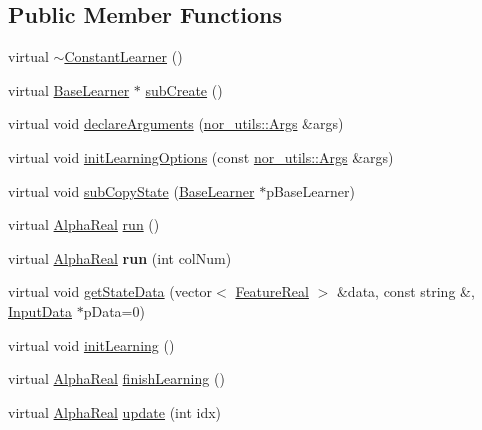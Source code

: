 \subsection*{Public Member Functions}
\begin{DoxyCompactItemize}
\item 
virtual \hyperlink{classMultiBoost_1_1ConstantLearner_aa71092f0e7659bd51efcc94cb411cf97}{$\sim$ConstantLearner} ()
\item 
virtual \hyperlink{classMultiBoost_1_1BaseLearner}{BaseLearner} $\ast$ \hyperlink{classMultiBoost_1_1ConstantLearner_a6f1e02f680c99526e2b6f8b2f199a2e0}{subCreate} ()
\item 
virtual void \hyperlink{classMultiBoost_1_1ConstantLearner_a02a3a2a863ec66ac0843eb866fbff1d1}{declareArguments} (\hyperlink{classnor__utils_1_1Args}{nor\_\-utils::Args} \&args)
\item 
virtual void \hyperlink{classMultiBoost_1_1ConstantLearner_a317362704802ea9f97a16511df0131ad}{initLearningOptions} (const \hyperlink{classnor__utils_1_1Args}{nor\_\-utils::Args} \&args)
\item 
virtual void \hyperlink{classMultiBoost_1_1ConstantLearner_a019e0eebd46b00a15b37bcb1d101f33d}{subCopyState} (\hyperlink{classMultiBoost_1_1BaseLearner}{BaseLearner} $\ast$pBaseLearner)
\item 
virtual \hyperlink{Defaults_8h_a80184c4fd10ab70a1a17c5f97dcd1563}{AlphaReal} \hyperlink{classMultiBoost_1_1ConstantLearner_a1aac8a845d9af374cdfa7348bd9a7df9}{run} ()
\item 
\hypertarget{classMultiBoost_1_1ConstantLearner_af0bd47c6e97246c5f2198a9646384e22}{
virtual \hyperlink{Defaults_8h_a80184c4fd10ab70a1a17c5f97dcd1563}{AlphaReal} {\bfseries run} (int colNum)}
\label{classMultiBoost_1_1ConstantLearner_af0bd47c6e97246c5f2198a9646384e22}

\item 
virtual void \hyperlink{classMultiBoost_1_1ConstantLearner_aee9280a797b4ba4ed38349ae728e9f09}{getStateData} (vector$<$ \hyperlink{Defaults_8h_a3a11cfe6a5d469d921716ca6291e934f}{FeatureReal} $>$ \&data, const string \&, \hyperlink{classMultiBoost_1_1InputData}{InputData} $\ast$pData=0)
\item 
virtual void \hyperlink{classMultiBoost_1_1ConstantLearner_a761f019d5284f616aa02bdced148b3b5}{initLearning} ()
\item 
virtual \hyperlink{Defaults_8h_a80184c4fd10ab70a1a17c5f97dcd1563}{AlphaReal} \hyperlink{classMultiBoost_1_1ConstantLearner_ad7ad5b2c0c2cfae7caeffccbcea7d520}{finishLearning} ()
\item 
virtual \hyperlink{Defaults_8h_a80184c4fd10ab70a1a17c5f97dcd1563}{AlphaReal} \hyperlink{classMultiBoost_1_1ConstantLearner_a221454ea3e6a1c9e4fcc1f9b5e8ff73e}{update} (int idx)
\end{DoxyCompactItemize}
